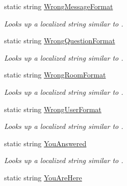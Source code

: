 \begin{DoxyCompactItemize}
static string \hyperlink{class_wis_r_1_1_app___resources_1_1_resource_a4dd5a46ec6f02e9605777915a1d291fe}{Wrong\+Message\+Format}
\begin{DoxyCompactList}\small\item\em Looks up a localized string similar to . \end{DoxyCompactList}\item 
static string \hyperlink{class_wis_r_1_1_app___resources_1_1_resource_aa1ca8a223e27da47910865245876fb26}{Wrong\+Question\+Format}
\begin{DoxyCompactList}\small\item\em Looks up a localized string similar to . \end{DoxyCompactList}\item 
static string \hyperlink{class_wis_r_1_1_app___resources_1_1_resource_a49e33a5cd0ea7ccca1502b13fa86c7ec}{Wrong\+Room\+Format}
\begin{DoxyCompactList}\small\item\em Looks up a localized string similar to . \end{DoxyCompactList}\item 
static string \hyperlink{class_wis_r_1_1_app___resources_1_1_resource_aa72f48580bba002395cf368c80207724}{Wrong\+User\+Format}
\begin{DoxyCompactList}\small\item\em Looks up a localized string similar to . \end{DoxyCompactList}\item 
static string \hyperlink{class_wis_r_1_1_app___resources_1_1_resource_abf024f56cae4f6745c169c03db91d899}{You\+Answered}
\begin{DoxyCompactList}\small\item\em Looks up a localized string similar to . \end{DoxyCompactList}\item 
static string \hyperlink{class_wis_r_1_1_app___resources_1_1_resource_ab86752c6994c2051e6bb075b5b39c6d3}{You\+Are\+Here}

\end{DoxyCompactItemize}
